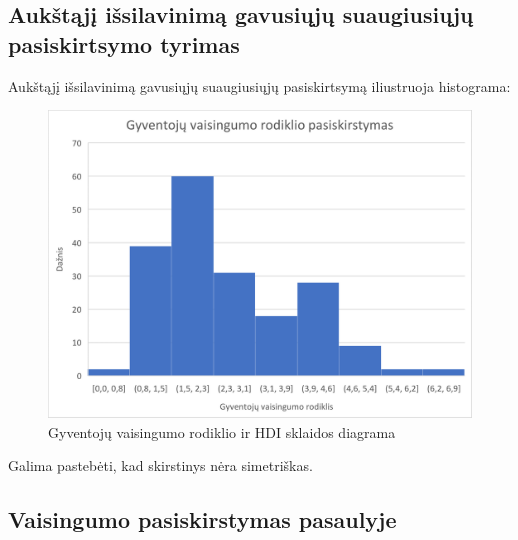 \subsection{Aukštąjį išsilavinimą gavusiųjų suaugiusiųjų pasiskirtsymo tyrimas} 

Aukštąjį išsilavinimą gavusiųjų suaugiusiųjų pasiskirtsymą iliustruoja histograma:
\begin{figure}[h]
    \centering
    \includegraphics[width=.5\textwidth]{pic/histo.png}
    \caption{Gyventojų vaisingumo rodiklio ir HDI sklaidos diagrama}
\end{figure}

Galima pastebėti, kad skirstinys nėra simetriškas.

\subsection{Vaisingumo pasiskirstymas pasaulyje}
